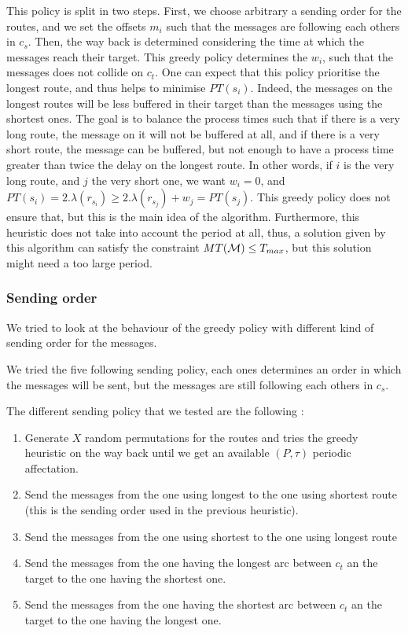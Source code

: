 \documentclass[a4paper,10pt]{article}
\begin{document}
    This policy is split in two steps. First, we choose arbitrary a sending order for the routes, and we set the offsets $m_i$ such that the messages are following each others in $c_s$. Then, the way back is determined considering the time at which the messages reach their target. This greedy policy determines the $w_i$, such that the messages does not collide on $c_t$. One can expect that this policy prioritise the longest route, and thus helps to minimise $PT(s_i)$. Indeed, the messages on the longest routes will be less buffered in their target than the messages using the shortest ones. The goal is to balance the process times such that if there is a very long route, the message on it will not be buffered at all, and if there is a very short route, the message can be buffered, but not enough to have a process time greater than twice the delay on the longest route. In other words, if $i$ is the very long route, and $j$ the very short one, we want $w_i =0$, and $PT(s_i) = 2.\lambda(r_{s_i}) \geq  2.\lambda(r_{s_j}) + w_j = PT(s_j) $.
    This greedy policy does not ensure that, but this is the main idea of the algorithm.
    Furthermore, this heuristic does not take into account the period at all, thus, a solution given by this algorithm can satisfy the constraint $MT({\cal M}) \leq T_{max}$, but this solution might need a too large period.

     \subsubsection{Sending order}
     
	We tried to look at the behaviour of the greedy policy with different kind of sending order for the messages.
	
	We tried the five following sending policy, each ones determines an order in which the messages will be sent, but the messages are still following each others in $c_s$.
	
	The different sending policy that we tested are the following :
	\begin{enumerate}
	 \item Generate $X$ random permutations for the routes and tries the greedy heuristic on the way back until we get an available $(P,\tau)$ periodic affectation.
	 \item Send the messages from the one using longest to the one using shortest route (this is the sending order used in the previous heuristic).
	 \item Send the messages from the one using shortest to the one using longest route
	 \item Send the messages from the one having the longest arc between $c_t$ an the target to the one having the shortest one.
	 \item Send the messages from the one having the shortest arc between $c_t$ an the target to the one having the longest one.
	\end{enumerate}
	
\end{document}
